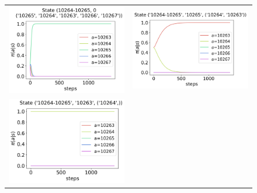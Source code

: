\begin{figure}[!htp]
    \centering
    \begin{tabular}{cc}
        \includegraphics[scale=0.36,valign=b]{chapters/figures/policy_NPG_state_0.png} &
        \includegraphics[scale=0.36,valign=b]{chapters/figures/policy_NPG_state_1.png} \\
        \hspace*{-5pt}\includegraphics[scale=0.36,valign=b]{chapters/figures/policy_NPG_state_2.png} &

\end{tabular}
\end{figure}
